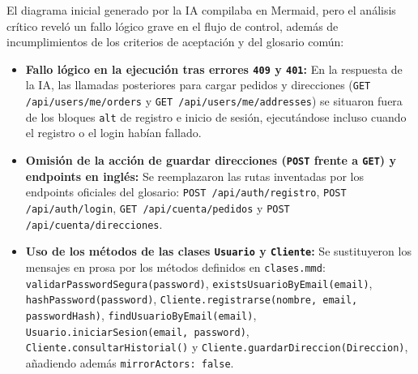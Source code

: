 El diagrama inicial generado por la IA compilaba en Mermaid, pero el análisis crítico reveló un fallo lógico grave en el flujo de control, además de incumplimientos de los criterios de aceptación y del glosario común:
\begin{itemize}[leftmargin=*,nosep]
\item \textbf{Fallo lógico en la ejecución tras errores \texttt{409} y \texttt{401}:} En la respuesta de la IA, las llamadas posteriores para cargar pedidos y direcciones (\texttt{GET /api/users/me/orders} y \texttt{GET /api/users/me/addresses}) se situaron fuera de los bloques \texttt{alt} de registro e inicio de sesión, ejecutándose incluso cuando el registro o el login habían fallado.
\item \textbf{Omisión de la acción de guardar direcciones (\texttt{POST} frente a \texttt{GET}) y endpoints en inglés:} Se reemplazaron las rutas inventadas por los endpoints oficiales del glosario: \texttt{POST /api/auth/registro}, \texttt{POST /api/auth/login}, \texttt{GET /api/cuenta/pedidos} y \texttt{POST /api/cuenta/direcciones}.
\item \textbf{Uso de los métodos de las clases \texttt{Usuario} y \texttt{Cliente}:} Se sustituyeron los mensajes en prosa por los métodos definidos en \texttt{clases.mmd}: \texttt{validarPasswordSegura(password)}, \texttt{existsUsuarioByEmail(email)}, \texttt{hashPassword(password)}, \texttt{Cliente.registrarse(nombre, email, passwordHash)}, \texttt{findUsuarioByEmail(email)}, \texttt{Usuario.iniciarSesion(email, password)}, \texttt{Cliente.consultarHistorial()} y \texttt{Cliente.guardarDireccion(Direccion)}, añadiendo además \texttt{mirrorActors: false}.
\end{itemize}
